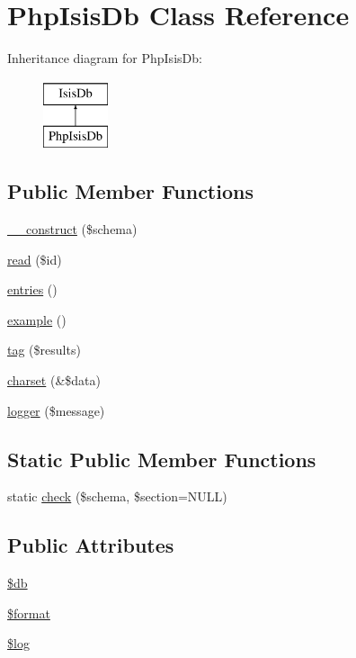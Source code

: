 \hypertarget{classPhpIsisDb}{
\section{PhpIsisDb Class Reference}
\label{classPhpIsisDb}
}
Inheritance diagram for PhpIsisDb:\begin{figure}[H]
\begin{center}
\leavevmode
\includegraphics[height=2.000000cm]{classPhpIsisDb}
\end{center}
\end{figure}
\subsection*{Public Member Functions}
\begin{DoxyCompactItemize}
\item 
\hyperlink{classPhpIsisDb_abb6db51373d065baf9135fd278653bc5}{\_\-\_\-construct} (\$schema)
\item 
\hyperlink{classPhpIsisDb_af2266931746f6f2335b831be8b8333fb}{read} (\$id)
\item 
\hyperlink{classPhpIsisDb_a0491ce84e5a85e775f811f18e63ef0fb}{entries} ()
\item 
\hyperlink{classPhpIsisDb_a7f4f3a9fd6dab86bd3cb3149d65f92cd}{example} ()
\item 
\hyperlink{classPhpIsisDb_a849f238c3323f53431be1c225a914d98}{tag} (\$results)
\item 
\hyperlink{classPhpIsisDb_a46f8c39b305f170e2cf8ae5f4d218e74}{charset} (\&\$data)
\item 
\hyperlink{classPhpIsisDb_a8d8185060a26d4fe673844b2ea3db39a}{logger} (\$message)
\end{DoxyCompactItemize}
\subsection*{Static Public Member Functions}
\begin{DoxyCompactItemize}
\item 
static \hyperlink{classPhpIsisDb_a23761cc04114090a2863467b2accc80a}{check} (\$schema, \$section=NULL)
\end{DoxyCompactItemize}
\subsection*{Public Attributes}
\begin{DoxyCompactItemize}
\item 
\hyperlink{classPhpIsisDb_a536e4c67dda71a7c7dad9ffbac299f9b}{\$db}
\item 
\hyperlink{classPhpIsisDb_a275e29f3711d37fc67cea340b564ddf3}{\$format}
\item 
\hyperlink{classPhpIsisDb_a0742105b3efab477fda99cd0561f98c7}{\$log}
\end{DoxyCompactItemize}


